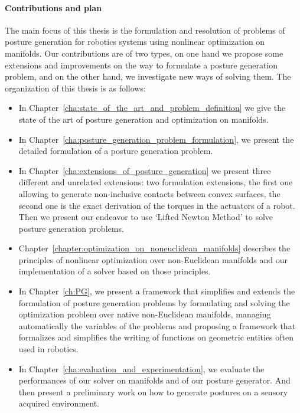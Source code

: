 \paragraph{Contributions and plan}
The main focus of this thesis is the formulation and resolution of problems of posture generation for robotics systems using nonlinear optimization on manifolds.
Our contributions are of two types, on one hand we propose some extensions and improvements on the way to formulate a posture generation problem, and on the other hand, we investigate new ways of solving them.
The organization of this thesis is as follows:
\begin{itemize}
  \item In Chapter~\ref{cha:state_of_the_art_and_problem_definition} we give the state of the art of posture generation and optimization on manifolds.
  \item In Chapter~\ref{cha:posture_generation_problem_formulation}, we present the detailed formulation of a posture generation problem.
  \item In Chapter~\ref{cha:extensions_of_posture_generation} we present three different and unrelated extensions: two formulation extensions, the first one allowing to generate non-inclusive contacts between convex surfaces, the second one is the exact derivation of the torques in the actuators of a robot. Then we present our endeavor to use `Lifted Newton Method' to solve posture generation problems.
  \item Chapter~\ref{chapter:optimization_on_noneuclidean_manifolds} describes the principles of nonlinear optimization over non-Euclidean manifolds and our implementation of a solver based on those principles.
  \item In Chapter~\ref{ch:PG}, we present a framework that simplifies and extends the formulation of posture generation problems by formulating and solving the optimization problem over native non-Euclidean manifolds, managing automatically the variables of the problems and proposing a framework that formalizes and simplifies the writing of functions on geometric entities often used in robotics.
  \item In Chapter~\ref{cha:evaluation_and_experimentation}, we evaluate the performances of our solver on manifolds and of our posture generator. And then present a preliminary work on how to generate postures on a sensory acquired environment.
\end{itemize}


